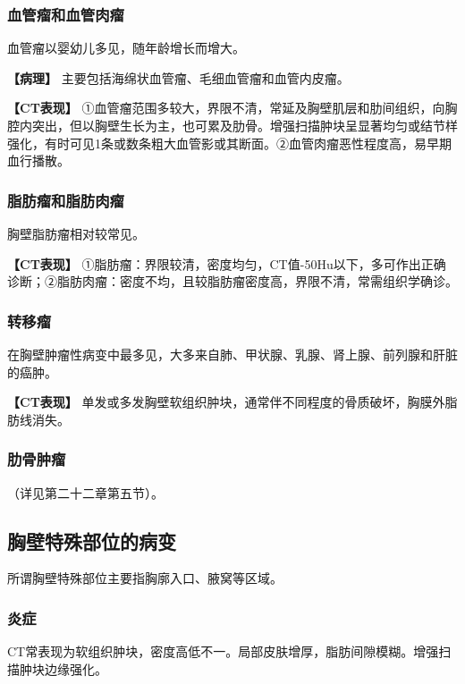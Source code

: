 \subsubsection{血管瘤和血管肉瘤}

血管瘤以婴幼儿多见，随年龄增长而增大。

\textbf{【病理】} 主要包括海绵状血管瘤、毛细血管瘤和血管内皮瘤。

\textbf{【CT表现】}
①血管瘤范围多较大，界限不清，常延及胸壁肌层和肋间组织，向胸腔内突出，但以胸壁生长为主，也可累及肋骨。增强扫描肿块呈显著均匀或结节样强化，有时可见1条或数条粗大血管影或其断面。②血管肉瘤恶性程度高，易早期血行播散。

\subsubsection{脂肪瘤和脂肪肉瘤}

胸壁脂肪瘤相对较常见。

\textbf{【CT表现】}
①脂肪瘤：界限较清，密度均匀，CT值-50Hu以下，多可作出正确诊断；②脂肪肉瘤：密度不均，且较脂肪瘤密度高，界限不清，常需组织学确诊。

\subsubsection{转移瘤}

在胸壁肿瘤性病变中最多见，大多来自肺、甲状腺、乳腺、肾上腺、前列腺和肝脏的癌肿。

\textbf{【CT表现】}
单发或多发胸壁软组织肿块，通常伴不同程度的骨质破坏，胸膜外脂肪线消失。

\subsubsection{肋骨肿瘤}

（详见第二十二章第五节）。

\subsection{胸壁特殊部位的病变}

所谓胸壁特殊部位主要指胸廓入口、腋窝等区域。

\subsubsection{炎症}

CT常表现为软组织肿块，密度高低不一。局部皮肤增厚，脂肪间隙模糊。增强扫描肿块边缘强化。

